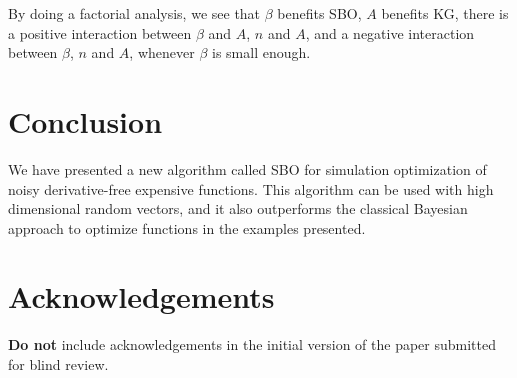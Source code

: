\documentclass{article}
\begin{document}
By doing a factorial analysis, we see that $\beta$ benefits SBO, $A$ benefits KG, there is a positive interaction between $\beta$ and $A$, $n$ and $A$, and a negative interaction between $\beta$, $n$ and $A$, whenever $\beta$ is small enough. 










\section{Conclusion}
\label{conclusion}
We have presented a new algorithm called SBO for simulation optimization of noisy derivative-free expensive functions. This algorithm can be used with high dimensional random vectors, and it also outperforms the classical Bayesian approach to optimize functions in the examples presented. 


\section*{Acknowledgements} 
 
\textbf{Do not} include acknowledgements in the initial version of
the paper submitted for blind review.

\nocite{langley00}



\end{document}
